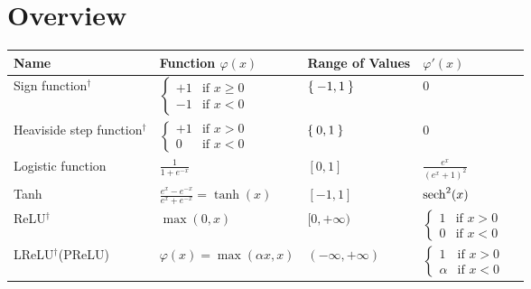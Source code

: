 
\appendix
\onecolumn
\section*{Overview}
\begin{table}[H]
    \centering
    \hspace*{-1cm}\begin{tabular}{lllll}
    \toprule
    Name                     & Function $\varphi(x)$ & Range of Values & $\varphi'(x)$ \\\midrule %
    Sign function$^\dagger$  & $\begin{cases}+1 &\text{if } x \geq 0\\-1 &\text{if } x < 0\end{cases}$ & $\Set{-1,1}$                              & $0$                    \\%
    \parbox[t]{2.6cm}{Heaviside\\step function$^\dagger$} & $\begin{cases}+1 &\text{if } x > 0\\0 &\text{if } x < 0\end{cases}$ & $\Set{0, 1}$  & $0$                       \\%
    Logistic function        & $\frac{1}{1+e^{-x}}$                           & $[0, 1]$                                                        & $\frac{e^x}{(e^x +1)^2}$  \\%
    Tanh                     & $\frac{e^x - e^{-x}}{e^x + e^{-x}} = \tanh(x)$ & $[-1, 1]$                                                       & $\operatorname*{sech}^2(x)$              \\%
    \gls{ReLU}$^\dagger$           & $\max(0, x)$                                   & $[0, +\infty)$                                                  & $\begin{cases}1 &\text{if } x > 0\\0 &\text{if } x < 0\end{cases}$      \\%
    \parbox[t]{2.6cm}{\gls{LReLU}$^\dagger$\footnotemark\\(\gls{PReLU})} & $\varphi(x) = \max(\alpha x, x)$                        & $(-\infty, +\infty)$                                             & $\begin{cases}1 &\text{if } x > 0\\\alpha &\text{if } x < 0\end{cases}$ \\%

\end{tabular}
\end{table}
